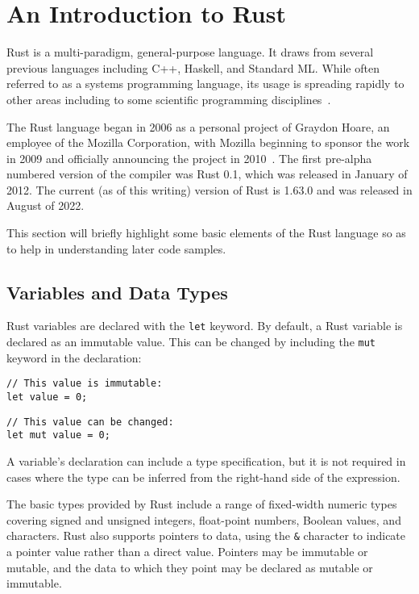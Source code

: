 \section{An Introduction to Rust}
\label{sec:rust}

Rust is a multi-paradigm, general-purpose language. It draws from several previous languages including C++, Haskell, and Standard ML. While often referred to as a systems programming language, its usage is spreading rapidly to other areas including to some scientific programming disciplines~\cite{nature.rust.2020}.

The Rust language began in 2006 as a personal project of Graydon Hoare, an employee of the Mozilla Corporation, with Mozilla beginning to sponsor the work in 2009 and officially announcing the project in 2010~\cite{asay.2021}. The first pre-alpha numbered version of the compiler was Rust 0.1, which was released in January of 2012. The current (as of this writing) version of Rust is 1.63.0 and was released in August of 2022.

This section will briefly highlight some basic elements of the Rust language so as to help in understanding later code samples.

\subsection{Variables and Data Types}

Rust variables are declared with the \texttt{let} keyword. By default, a Rust variable is declared as an immutable value. This can be changed by including the \texttt{mut} keyword in the declaration:

\begin{lstlisting}
// This value is immutable:
let value = 0;
\end{lstlisting}
\begin{lstlisting}
// This value can be changed:
let mut value = 0;
\end{lstlisting}

A variable's declaration can include a type specification, but it is not required in cases where the type can be inferred from the right-hand side of the expression.

The basic types provided by Rust include a range of fixed-width numeric types covering signed and unsigned integers, float-point numbers, Boolean values, and characters. Rust also supports pointers to data, using the \texttt{\&} character to indicate a pointer value rather than a direct value. Pointers may be immutable or mutable, and the data to which they point may be declared as mutable or immutable.

